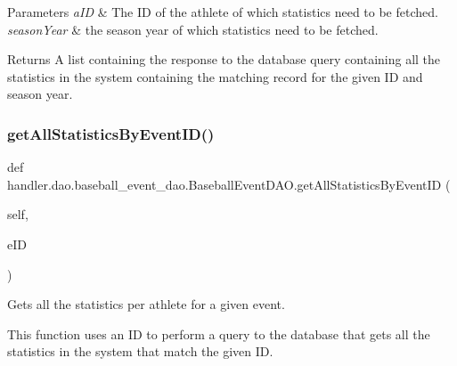 \begin{DoxyParams}{Parameters}
{\em a\+ID} & The ID of the athlete of which statistics need to be fetched. \\
\hline
{\em season\+Year} & the season year of which statistics need to be fetched.\\
\hline
\end{DoxyParams}
\begin{DoxyReturn}{Returns}
A list containing the response to the database query containing all the statistics in the system containing the matching record for the given ID and season year. 
\end{DoxyReturn}
\mbox{\label{classhandler_1_1dao_1_1baseball__event__dao_1_1_baseball_event_d_a_o_ac4c5002b51cb2404eddc669adf19c9df}} 
\subsubsection{\texorpdfstring{get\+All\+Statistics\+By\+Event\+I\+D()}{getAllStatisticsByEventID()}}
{\footnotesize\ttfamily def handler.\+dao.\+baseball\+\_\+event\+\_\+dao.\+Baseball\+Event\+D\+A\+O.\+get\+All\+Statistics\+By\+Event\+ID (\begin{DoxyParamCaption}\item[{}]{self,  }\item[{}]{e\+ID }\end{DoxyParamCaption})}



Gets all the statistics per athlete for a given event. 

This function uses an ID to perform a query to the database that gets all the statistics in the system that match the given ID.


